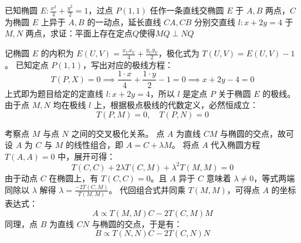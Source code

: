 \begin{exercise}
已知椭圆 \(E: \frac{x^2}{4} + \frac{y^2}{2} = 1\)，过点 \(P(1,1)\) 任作一条直线交椭圆 \(E\) 于 \(A, B\) 两点，\(C\) 为椭圆 \(E\) 上异于 \(A, B\) 的一动点，延长直线 \(CA, CB\) 分别交直线 \(l: x + 2y = 4\) 于 \(M, N\) 两点，求证：平面上存在定点$Q$使得\(MQ \perp NQ\)
\end{exercise}
\begin{solution}
记椭圆 $E$ 的内积为 $E(U,V) = \frac{x_U x_V}{4} + \frac{y_U y_V}{2}$，极化式为 $T(U,V) = E(U,V) - 1$。
已知定点 $P(1,1)$，写出对应的极线方程：
$$ T(P, X) = 0 \implies \frac{1 \cdot x}{4} + \frac{1 \cdot y}{2} - 1 = 0 \implies x + 2y - 4 = 0 $$
上式即为题目给定的定直线 $l: x + 2y = 4$，所以 $l$ 是定点 $P$ 关于椭圆 $E$ 的极线。
由于点 $M, N$ 均在极线 $l$ 上，根据极点极线的代数定义，必然恒成立：
$$ T(P, M) = 0, \quad T(P, N) = 0 $$

考察点 $M$ 与点 $N$ 之间的交叉极化关系。
点 $A$ 为直线 $CM$ 与椭圆的交点，故可设 $A$ 为 $C$ 与 $M$ 的线性组合，即 $A = C + \lambda M$。
将点 $A$ 代入椭圆方程 $T(A,A) = 0$ 中，展开可得：
$$ T(C,C) + 2\lambda T(C,M) + \lambda^2 T(M,M) = 0 $$
由于动点 $C$ 在椭圆上，有 $T(C,C) = 0$。且 $A$ 异于 $C$ 意味着 $\lambda \neq 0$，等式两端同除以 $\lambda$ 解得 $\lambda = \frac{-2T(C,M)}{T(M,M)}$。
代回组合式并同乘 $T(M,M)$，可得点 $A$ 的坐标表达式：
$$ A \propto T(M,M)C - 2T(C,M)M $$
同理，点 $B$ 为直线 $CN$ 与椭圆的交点，于是有：
$$ B \propto T(N,N)C - 2T(C,N)N $$


\end{solution}
